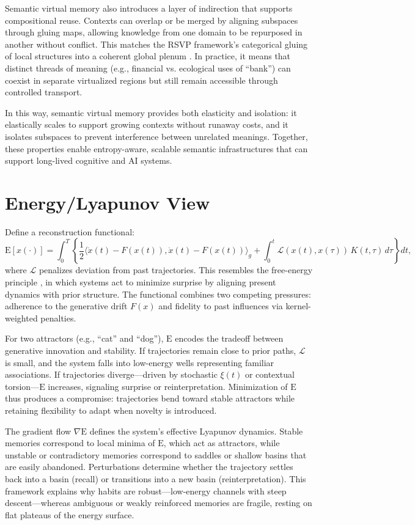 \documentclass[a4paper,12pt]{article}
\newcommand{\E}{\mathrm{E}}
\begin{document}
Semantic virtual memory also introduces a layer of indirection that supports compositional reuse. 
Contexts can overlap or be merged by aligning subspaces through gluing maps, allowing knowledge 
from one domain to be repurposed in another without conflict. This matches the RSVP framework’s 
categorical gluing of local structures into a coherent global plenum \citep{semantic2025}. In practice, 
it means that distinct threads of meaning (e.g., financial vs. ecological uses of ``bank'') can coexist 
in separate virtualized regions but still remain accessible through controlled transport.

In this way, semantic virtual memory provides both elasticity and isolation: it elastically scales to 
support growing contexts without runaway costs, and it isolates subspaces to prevent interference 
between unrelated meanings. Together, these properties enable entropy-aware, scalable semantic 
infrastructures that can support long-lived cognitive and AI systems.

\section{Energy/Lyapunov View}
Define a reconstruction functional:
\[
\E[x(\cdot)] = \int_0^T \left\{ \frac{1}{2} \langle \dot{x}(t) - F(x(t)), \dot{x}(t) - F(x(t)) \rangle_g + \int_0^t \mathcal{L}(x(t), x(\tau)) \, K(t,\tau) \, d\tau \right\} dt,
\]
where $\mathcal{L}$ penalizes deviation from past trajectories. This resembles the free-energy 
principle \citep{friston2010free}, in which systems act to minimize surprise by aligning present 
dynamics with prior structure. The functional combines two competing pressures: adherence to 
the generative drift $F(x)$ and fidelity to past influences via kernel-weighted penalties. 

For two attractors (e.g., ``cat'' and ``dog''), $\E$ encodes the tradeoff between generative 
innovation and stability. If trajectories remain close to prior paths, $\mathcal{L}$ is small, 
and the system falls into low-energy wells representing familiar associations. If trajectories 
diverge—driven by stochastic $\xi(t)$ or contextual torsion—$\E$ increases, signaling surprise 
or reinterpretation. Minimization of $\E$ thus produces a compromise: trajectories bend toward 
stable attractors while retaining flexibility to adapt when novelty is introduced.

The gradient flow $\nabla \E$ defines the system’s effective Lyapunov dynamics. Stable memories 
correspond to local minima of $\E$, which act as attractors, while unstable or contradictory 
memories correspond to saddles or shallow basins that are easily abandoned. Perturbations 
determine whether the trajectory settles back into a basin (recall) or transitions into a new 
basin (reinterpretation). This framework explains why habits are robust—low-energy channels 
with steep descent—whereas ambiguous or weakly reinforced memories are fragile, resting on 
flat plateaus of the energy surface.
\end{document}

